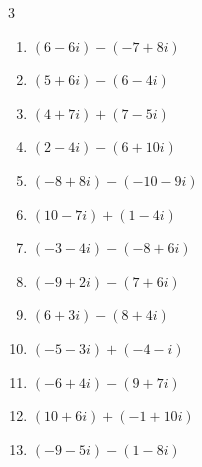 \begin{multicols}{3}
\begin{enumerate}
  \item $\displaystyle (6-6i) - (-7+8i)$

        \phantom{$\displaystyle =13-14i$}

  \item $\displaystyle (5+6i) - (6-4i)$

        \phantom{$\displaystyle =-1+10i$}

  \item $\displaystyle (4+7i) + (7-5i)$

        \phantom{$\displaystyle =11+2i$}

  \item $\displaystyle (2-4i) - (6+10i)$

        \phantom{$\displaystyle =-4-14i$}

  \item $\displaystyle (-8+8i) - (-10-9i)$

        \phantom{$\displaystyle =2+17i$}

  \item $\displaystyle (10-7i) + (1-4i)$

        \phantom{$\displaystyle =11-11i$}

  \item $\displaystyle (-3-4i) - (-8+6i)$

        \phantom{$\displaystyle =5-10i$}

\columnbreak %

  \item $\displaystyle (-9+2i) - (7+6i)$

        \phantom{$\displaystyle =-16-4i$}

  \item $\displaystyle (6+3i) - (8+4i)$

        \phantom{$\displaystyle =-2-i$}

  \item $\displaystyle (-5-3i) + (-4-i)$

        \phantom{$\displaystyle =-9-4i$}

  \item $\displaystyle (-6+4i) - (9+7i)$

        \phantom{$\displaystyle =-15-3i$}

  \item $\displaystyle (10+6i) + (-1+10i)$

        \phantom{$\displaystyle =9+16i$}

  \item $\displaystyle (-9-5i) - (1-8i)$


\end{enumerate}
\end{multicols}
